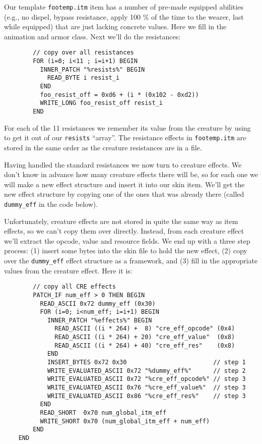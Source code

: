 \documentclass{article}
\def\ttref#1{\ahrefloc{#1}{\tt #1}}
\def\t#1{{\tt #1}}
\begin{document}
Our template \t{footemp.itm} item has a number of pre-made equipped
abilities (e.g., no dispel, bypass resistance, apply 100 \% of the time to
the wearer, last while equipped) that are just lacking concrete values.
Here we fill in the animation and armor class. Next we'll do the
resistances:

\begin{verbatim}
        // copy over all resistances
        FOR (i=0; i<11 ; i=i+1) BEGIN
          INNER_PATCH "%resists%" BEGIN
            READ_BYTE i resist_i
          END
          foo_resist_off = 0xd6 + (i * (0x102 - 0xd2))
          WRITE_LONG foo_resist_off resist_i
        END
\end{verbatim}

For each of the 11 resistances we remember its value from the creature by
using \ttref{INNER!PATCH} to get it out of our \t{resists} ``array''. The
resistance effects in \t{footemp.itm} are stored in the same order as the
creature resistances are in a \ttref{CRE} file.

Having handled the standard resistances we now turn to creature effects.
We don't know in advance how many creature effects there will be, so for
each one we will make a new effect structure and insert it into our skin
item. We'll get the new effect structure by copying one of the ones that
was already there (called \t{dummy\_eff} in the code below).

Unfortunately, creature effects are not stored in quite the same way as item
effects, so we can't copy them over directly. Instead, from each creature
effect we'll extract the opcode, value and resource fields. We end up with
a three step process: (1) insert some bytes into the skin file to hold the new
effect, (2) copy over the \t{dummy\_eff} effect structure as a framework,
and (3) fill in the appropriate values from the creature effect. Here it
is:

\begin{verbatim}
        // copy all CRE effects
        PATCH_IF num_eff > 0 THEN BEGIN
          READ_ASCII 0x72 dummy_eff (0x30)
          FOR (i=0; i<num_eff; i=i+1) BEGIN
            INNER_PATCH "%effects%" BEGIN
              READ_ASCII ((i * 264) +  8) "cre_eff_opcode" (0x4)
              READ_ASCII ((i * 264) + 20) "cre_eff_value"  (0x8)
              READ_ASCII ((i * 264) + 40) "cre_eff_res"    (0x8)
            END
            INSERT_BYTES 0x72 0x30                        // step 1
            WRITE_EVALUATED_ASCII 0x72 "%dummy_eff%"      // step 2
            WRITE_EVALUATED_ASCII 0x72 "%cre_eff_opcode%" // step 3
            WRITE_EVALUATED_ASCII 0x76 "%cre_eff_value%"  // step 3
            WRITE_EVALUATED_ASCII 0x86 "%cre_eff_res%"    // step 3
          END
          READ_SHORT  0x70 num_global_itm_eff
          WRITE_SHORT 0x70 (num_global_itm_eff + num_eff)
        END
    END
\end{verbatim}
\end{document}
